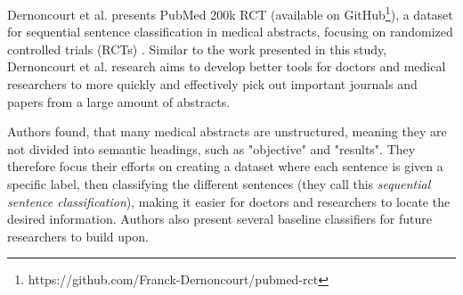 Dernoncourt et al. presents PubMed 200k RCT (available on GitHub\footnote{https://github.com/Franck-Dernoncourt/pubmed-rct}), a dataset for sequential sentence classification in medical abstracts, focusing on randomized controlled trials (RCTs) \cite{dernoncourt2017pubmed}. Similar to the work presented in this study, Dernoncourt et al. research aims to develop better tools for doctors and medical researchers to more quickly and effectively pick out important journals and papers from a large amount of abstracts. 

Authors found, that many medical abstracts are unstructured, meaning they are not divided into semantic headings, such as "objective" and "results". They therefore focus their efforts on creating a dataset where each sentence is given a specific label, then classifying the different sentences (they call this \textit{sequential sentence classification}), making it easier for doctors and researchers to locate the desired information. Authors also present several baseline classifiers for future researchers to build upon. 